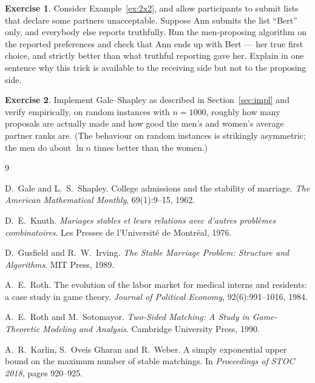 \documentclass[11pt,a4paper]{article}
\theoremstyle{plain}
\theoremstyle{definition}
\newtheorem{exercise}{Exercise}
\theoremstyle{remark}
\begin{document}
\begin{exercise}\label{exc:lying}
Consider Example~\ref{ex:2x2}, and allow participants to submit lists that
declare some partners unacceptable. Suppose Ann submits the list ``Bert''
only, and everybody else reports truthfully. Run the men-proposing algorithm
on the reported preferences and check that Ann ends up with Bert --- her true
first choice, and strictly better than what truthful reporting gave her.
Explain in one sentence why this trick is available to the receiving side but
not to the proposing side.
\end{exercise}

\begin{exercise}
Implement Gale--Shapley as described in Section~\ref{sec:impl} and verify
empirically, on random instances with $n = 1000$, roughly how many proposals
are actually made and how good the men's and women's average partner ranks
are. (The behaviour on random instances is strikingly asymmetric; the men do
about $\ln n$ times better than the women.)
\end{exercise}

\begin{thebibliography}{9}

D.~Gale and L.~S.~Shapley.
\newblock College admissions and the stability of marriage.
\newblock \emph{The American Mathematical Monthly}, 69(1):9--15, 1962.

D.~E.~Knuth.
\newblock \emph{Mariages stables et leurs relations avec d'autres problèmes
combinatoires}.
\newblock Les Presses de l'Université de Montréal, 1976.

D.~Gusfield and R.~W.~Irving.
\newblock \emph{The Stable Marriage Problem: Structure and Algorithms}.
\newblock MIT Press, 1989.

A.~E.~Roth.
\newblock The evolution of the labor market for medical interns and residents:
a case study in game theory.
\newblock \emph{Journal of Political Economy}, 92(6):991--1016, 1984.

A.~E.~Roth and M.~Sotomayor.
\newblock \emph{Two-Sided Matching: A Study in Game-Theoretic Modeling and
Analysis}.
\newblock Cambridge University Press, 1990.

A.~R.~Karlin, S.~Oveis Gharan and R.~Weber.
\newblock A simply exponential upper bound on the maximum number of stable
matchings.
\newblock In \emph{Proceedings of STOC 2018}, pages 920--925.

\end{thebibliography}
\end{document}
